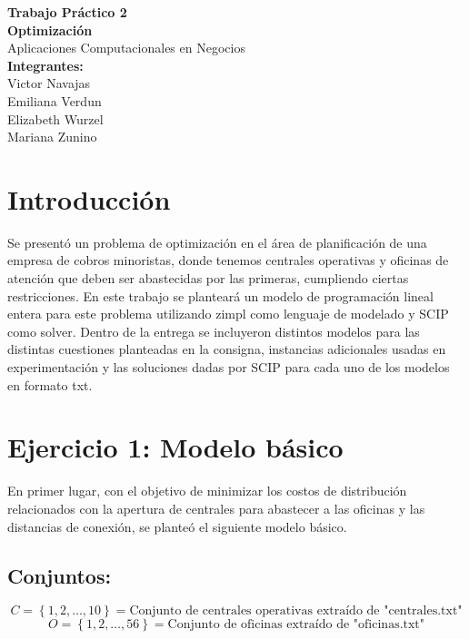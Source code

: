 \documentclass{article}
\begin{document}
\begin{titlepage}
    \centering
    \vspace*{2cm}
    
    {\Huge \textbf{Trabajo Práctico 2}}\\[1cm]
    {\Large \textbf{Optimización}}\\
    {\Large Aplicaciones Computacionales en Negocios}\\[0.5cm]
    
    \vspace{2cm}
    \textbf{\large Integrantes:}\\[0.5cm]
    {\large
    Victor Navajas\\
    Emiliana Verdun\\
    Elizabeth Wurzel \\
    Mariana Zunino \\
    }
    
    \vfill
    \end{titlepage}

\section*{Introducción}

Se presentó un problema de optimización en el área de planificación de una empresa de cobros minoristas, donde tenemos centrales operativas y oficinas de atención que deben ser abastecidas por las primeras, cumpliendo ciertas restricciones. En este trabajo se planteará un modelo de programación lineal entera para este problema utilizando zimpl como lenguaje de modelado y SCIP como solver. Dentro de la entrega se incluyeron distintos modelos para las distintas cuestiones planteadas en la consigna, instancias adicionales usadas en experimentación y las soluciones dadas por SCIP para cada uno de los modelos en formato txt.

\section*{Ejercicio 1: Modelo básico}

En primer lugar, con el objetivo de minimizar los costos de distribución relacionados con la apertura de centrales para abastecer a las oficinas y las distancias de conexión, se planteó el siguiente modelo básico.

\subsection*{Conjuntos:}
\[
C = \left\{ 1, 2, \ldots, 10 \right\} = \text{Conjunto de centrales operativas extraído de "centrales.txt"}
\]
\[
O = \left\{ 1, 2, \ldots, 56 \right\} = \text{Conjunto de oficinas extraído de "oficinas.txt"}
\]
\end{document}
